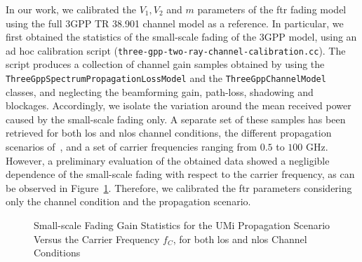 In our work, we calibrated the $V_1, V_2$ and $m$ parameters of the \gls{ftr} fading model using the full 3GPP TR 38.901 channel model as a reference. 
In particular, we first obtained the statistics of the small-scale fading of the 3GPP model, using an ad hoc calibration script (\texttt{three-\-gpp-\-two-\-ray-\-channel-\-calibration.cc}). The script produces a collection of channel gain samples obtained by using the \texttt{Three\-Gpp\-Spectrum\-Propagation\-Loss\-Model} and the \texttt{Three\-Gpp\-Channel\-Model} classes, and neglecting the beamforming gain, path-loss, shadowing and blockages. Accordingly, we isolate the variation around the mean received power caused by the small-scale fading only. 
A separate set of these samples has been retrieved for both \gls{los} and \gls{nlos} channel conditions, the different propagation scenarios of~\cite{TR38901}, and a set of carrier frequencies ranging from $0.5$ to $100$ GHz. However, a preliminary evaluation of the obtained data showed a negligible dependence of the small-scale fading with respect to the carrier frequency, as can be observed in Figure~\ref{fig:fading_vs_fc}. Therefore, we calibrated the \gls{ftr} parameters considering only the channel condition and the propagation scenario.

\begin{figure}
    \centering 
    \setlength{}
    \setlength{}
    
    \caption{Small-scale Fading Gain Statistics for the UMi Propagation Scenario Versus the Carrier Frequency $f_C$, for both \gls{los} and \gls{nlos} Channel Conditions}
    \label{fig:fading_vs_fc}
\end{figure}


